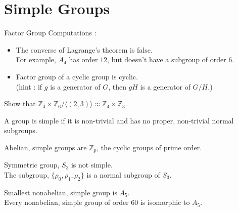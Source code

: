 \section{Simple Groups}
\begin{remark}Factor Group Computations :
\begin{itemize}
	\item The converse of Lagrange's theorem is false.\\
	For example, $A_4$ has order $12$, but doesn't have a subgroup of order $6$.
	\item Factor group of a cyclic group is cyclic.\\
	(hint : if $g$ is a generator of $G$, then $gH$ is a generator of $G/H$.)
\end{itemize}
\end{remark}

\begin{question}
	Show that $\mathbb{Z}_4 \times \mathbb{Z}_6 / \langle (2,3) \rangle \approx \mathbb{Z}_4 \times \mathbb{Z}_3$.
\end{question}

\begin{definition}
	A group is simple if it is non-trivial and has no proper, non-trivial normal subgroups.
\end{definition}

\begin{remark}
	Abelian, simple groups are $\mathbb{Z}_p$, the cyclic groups of prime order.
\end{remark}

\begin{remark}
	Symmetric group, $S_3$ is not simple.\\
	The subgroup, $\{ \rho_0,\rho_1,\rho_2\}$ is a normal subgroup of $S_3$.
\end{remark}

\begin{remark}
	Smallest nonabelian, simple group is $A_5$.\\
	Every nonabelian, simple group of order $60$ is isomorphic to $A_5$.
\end{remark}



